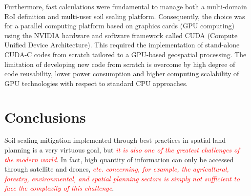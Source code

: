 \documentclass[APA,LATO1COL,doublespace]{WileyNJD-v2}
\newcommand{\toberevised}[1]{\emph{\textcolor{red}{#1}}} %
\begin{document}
Furthermore, fast calculations were fundamental to manage both a multi-domain RoI definition and multi-user soil sealing platform.
Consequently, the choice was for a parallel computing platform based on graphics cards (GPU computing) using the NVIDIA hardware and software framework called CUDA (Compute Unified Device Architecture).
This required the implementation of stand-alone CUDA-C codes from scratch tailored to a GPU-based geospatial processing.
The limitation of developing new code from scratch is overcome by high degree of code reusability, lower power consumption and higher computing scalability of GPU technologies with respect to standard CPU approaches.





\section{Conclusions}
Soil sealing mitigation implemented through best practices in spatial land planning is a very virtuous goal, but \toberevised{it is also one of the greatest challenges of the modern world}. 
In fact, high quantity of information can only be accessed through satellite and drones, \toberevised{etc. concerning, for example, the agricultural, forestry, environmental, and spatial planning sectors is simply not sufficient to face the complexity of this challenge}.
\end{document}
